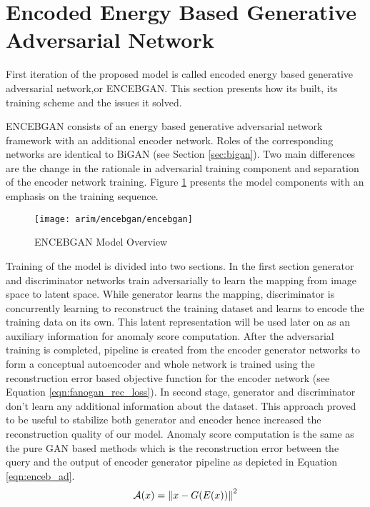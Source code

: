 \section{Encoded Energy Based Generative Adversarial Network}
\label{sec:encebgan}

First iteration of the proposed model is called encoded energy based generative adversarial
network,or ENCEBGAN. This section presents how its built, its training scheme and the issues it
solved.

ENCEBGAN consists of an energy based generative adversarial network framework with an additional
encoder network. Roles of the corresponding networks are identical to BiGAN (see Section \ref{sec:bigan}). Two main
differences are the change in the rationale in adversarial training component and separation of the
encoder network training. Figure \ref{fig:encebgan_model} presents the model components with an
emphasis on the training sequence.
\begin{figure}[h!]
	\centering
	\texttt{[image: arim/encebgan/encebgan]}
	\caption{ENCEBGAN Model Overview }
	\label{fig:encebgan_model}
\end{figure}

Training of the model is divided into two sections. In the first section generator and discriminator networks
train adversarially to learn the mapping from image space to latent space. While generator learns
the mapping, discriminator is concurrently learning to reconstruct the training dataset and learns
to encode the training data on its own. This latent representation will be used later on as an
auxiliary information for anomaly score computation. After the adversarial training is completed,
pipeline is created from the encoder generator networks to form a conceptual autoencoder and whole
network is trained using the reconstruction error based objective function for the encoder network (see Equation \ref{eqn:fanogan_rec_loss}).
In second stage, generator and discriminator don't learn any additional information about the
dataset. This approach proved to be useful to stabilize both generator and encoder hence increased
the reconstruction quality of our model. Anomaly score computation is the same as the pure GAN based
methods which is the reconstruction error between the query and the output of encoder generator
pipeline as depicted in Equation \ref{eqn:enceb_ad}. 
\begin{equation}
	\label{eqn:enceb_ad}
	\mathcal{A}(x) = \left\lVert x - G(E(x))\right\rVert^2
\end{equation}

